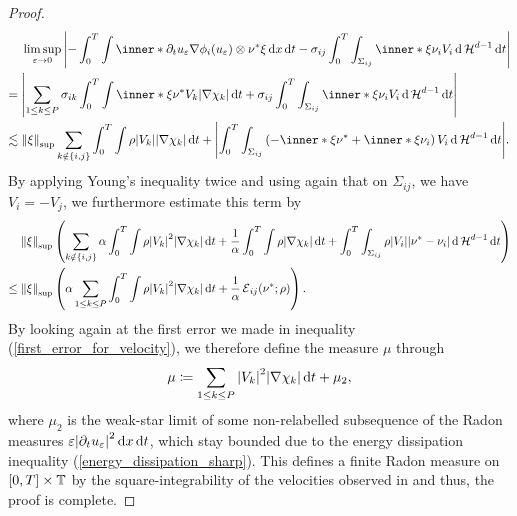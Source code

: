 \begin{proof}
\begin{align*}
		& \limsup_{ \varepsilon \to 0 }
		\abs{
			- \int_{ 0 }^{ T }
			\int
			\inner*{ \partial_{ t } u_{ 
					\varepsilon } }{ \nabla \phi_{ i } ( u_{ 
					\varepsilon } ) 
				\otimes \nu^{ \ast } \xi }
			\dd{ x }
			\dd{ t }
			-
			\sigma_{ i j }
			\int_{ 0 }^{ T }
			\int_{ \Sigma_{ i j } }
			\inner*{ \xi }{ \nu_{ i } }
			V_{ i } 	
			\dd{ \hm^{ d - 1 } }
			\dd{ t }
		}
		\\
		={} &
		\abs{
			\sum_{ 1 \leq k \leq P }
			\sigma_{ i k }
			\int_{ 0 }^{ T }
			\int
			\inner*{ \xi }{ \nu^{ \ast } }
			V_{ k }
			\abs{ \nabla \chi_{ k } }
			\dd{ t }
			+
			\sigma_{ i j }
			\int_{ 0 }^{ T }
			\int_{ \Sigma_{ i j } }
			\inner*{ \xi }{ \nu_{ i } }
			V_{ i }
			\dd{ \hm^{ d - 1 } }
			\dd{ t }
		}
		\\
		\lesssim{} &
		\norm{ \xi }_{ \mathrm{sup} }
		\sum_{ k \notin \{ i , j \} }
		\int_{ 0 }^{ T }
		\int
		\rho
		\abs{ V_{ k } }
		\abs{ \nabla \chi_{ k } }
		\dd{ t }
		+
		\abs{
			\int_{ 0 }^{ T }
			\int_{ \Sigma_{ i j } }
			\left(
			-\inner*{ \xi }{ \nu^{ \ast } }
			+
			\inner*{ \xi }{ \nu_{ i } }
			\right)
			V_{ i }
			\dd{ \hm^{ d -1 } }
			\dd{ t }
		}.
	\end{align*}
	By applying Young's inequality twice and using again that on $ \Sigma_{ i j 
	} 
	$, we have $ V_{ 
		i } = - V_{ j } $, we furthermore estimate this term by
	\begin{align*}
		& \norm{ \xi }_{ \mathrm{sup} }
		\left(
		\sum_{ k \notin \{ i , j \} }
		\alpha 
		\int_{ 0 }^{ T }
		\int
		\rho
		\abs{ V_{ k } }^{ 2 }
		\abs{ \nabla \chi_{ k } }
		\dd{ t }
		+
		\frac{ 1 }{ \alpha }
		\int_{ 0 }^{ T }
		\int
		\rho
		\abs{ \nabla \chi_{ k } }
		\dd{ t }
		+
		\int_{ 0 }^{ T }
		\int_{ \Sigma_{ i j } }
		\rho
		\abs{ V_{ i } }
		\abs{ \nu^{ \ast } - \nu_{ i } }
		\dd{ \hm^{ d - 1 } }
		\dd{ t }
		\right)
		\\
		\leq{} &
		\norm{ \xi }_{\mathrm{sup} }
		\left(
		\alpha
		\sum_{ 1 \leq k \leq P }
		\int_{ 0 }^{ T }
		\int
		\rho
		\abs{ V_{ k } }^{ 2 }
		\abs{ \nabla \chi_{ k } }
		\dd{ t}
		+
		\frac{ 1 }{ \alpha }
		\tilt_excess_{ i j } ( \nu^{ \ast } ; \rho )
		\right).
	\end{align*}
	By looking again at the first error we made in inequality 
	(\ref{first_error_for_velocity}), we therefore define the measure $ \mu $ 
	through
	\begin{equation*}
		\mu
		\coloneqq
		\sum_{ 1 \leq k \leq P }
		\abs{ V_{ k } }^{ 2 }
		\abs{ \nabla \chi_{ k } }
		\dd{ t }
		+
		\mu_{ 2 },
	\end{equation*}
	where $ \mu_{ 2 } $ is the weak-star limit of some non-relabelled 
	subsequence of the Radon measures $ \varepsilon \abs{ \partial_{ t } u_{ 
			\varepsilon } }^{ 2 } \dd{ x } \dd{ t } $, which stay bounded due 
			to the 
	energy dissipation inequality (\ref{energy_dissipation_sharp}).
	This defines a finite Radon measure on $ [ 0 , T ] \times \operatorname{\mathbb{T}} $ by 
	the square-integrability of the velocities observed in 
	 and 
	thus, the proof is complete.
\end{proof}


